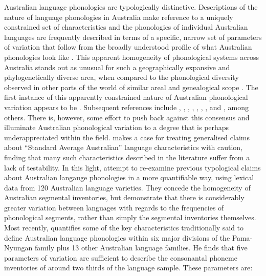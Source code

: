Australian language phonologies are typologically distinctive. Descriptions of the nature of language phonologies in Australia make reference to a uniquely constrained set of characteristics and the phonologies of individual Australian languages are frequently described in terms of a specific, narrow set of parameters of variation that follow from the broadly understood profile of what Australian phonologies look like \autocites[e.g.][p.~11]{goddard_grammar_1985}[p.~52]{evans_grammar_1995}[p.~7]{breen_grammar_2007}[p.~23]{gaby_grammar_2006}. This apparent homogeneity of phonological systems across Australia stands out as unusual for such a geographically expansive and phylogenetically diverse area, when compared to the phonological diversity observed in other parts of the world of similar areal and genealogical scope \autocites{maddieson_patterns_1984}{mielke_emergence_2008}. The first instance of this apparently constrained nature of Australian phonological variation appears to be \textcite{schmidt_gliederung_1919}. Subsequent references include \textcite{capell_new_1956}, \textcite{voegelin_obtaining_1963}, \textcite{dixon_languages_1980}, \textcite{busby_distribution_1982}, \textcite{hamilton_phonetic_1996}, \textcite{butcher_australian_2006}, \textcite{dixon_australian_2002}, and \textcite{baker_word_2014}, among others. There is, however, some effort to push back against this consensus and illuminate Australian phonological variation to a degree that is perhaps underappreciated within the field. \textcite{bowern_standard_2017} makes a case for treating generalised claims about ``Standard Average Australian'' language characteristics with caution, finding that many such characteristics described in the literature suffer from a lack of testability. In this light, \textcite{gasser_revisiting_2014} attempt to re-examine previous typological claims about Australian langauge phonologies in a more quantifiable way, using lexical data from 120 Australian language varieties. They concede the homogeneity of Australian segmental inventories, but demonstrate that there is considerably greater variation between languages with regards to the frequencies of phonological segments, rather than simply the segmental inventories themselves. Most recently, \textcite{round_segment_2021} quantifies some of the key characteristics traditionally said to define Australian language phonologies within six major divisions of the Pama-Nyungan family plus 13 other Australian language families. He finds that five parameters of variation are sufficient to describe the consonantal phoneme inventories of around two thirds of the language sample. These parameters are:

